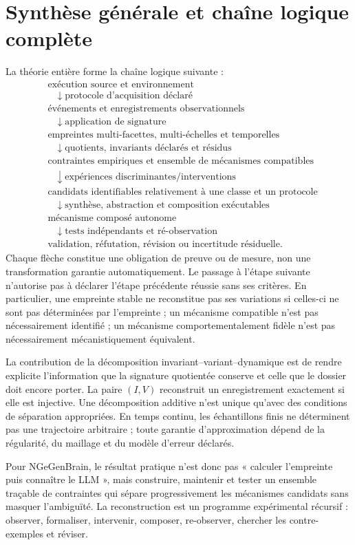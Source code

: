 \documentclass[11pt,oneside]{book}
\theoremstyle{definition}
\theoremstyle{remark}
\newcommand{\1}{\mathbf 1}
\begin{document}
\chapter{Synthèse générale et chaîne logique complète}
La théorie entière forme la chaîne logique suivante :
\[
\begin{aligned}
&\text{exécution source et environnement}\\
&\quad\downarrow\;\text{protocole d'acquisition déclaré}\\
&\text{événements et enregistrements observationnels}\\
&\quad\downarrow\;\text{application de signature}\\
&\text{empreintes multi-facettes, multi-échelles et temporelles}\\
&\quad\downarrow\;\text{quotients, invariants déclarés et résidus}\\
&\text{contraintes empiriques et ensemble de mécanismes compatibles}\\
&\quad\downarrow\;\text{expériences discriminantes/interventions}\\
&\text{candidats identifiables relativement à une classe et un protocole}\\
&\quad\downarrow\;\text{synthèse, abstraction et composition exécutables}\\
&\text{mécanisme composé autonome}\\
&\quad\downarrow\;\text{tests indépendants et ré-observation}\\
&\text{validation, réfutation, révision ou incertitude résiduelle}.
\end{aligned}
\]
Chaque flèche constitue une obligation de preuve ou de mesure, non une transformation garantie automatiquement. Le passage à l'étape suivante n'autorise pas à déclarer l'étape précédente réussie sans ses critères. En particulier, une empreinte stable ne reconstitue pas ses variations si celles-ci ne sont pas déterminées par l'empreinte ; un mécanisme compatible n'est pas nécessairement identifié ; un mécanisme comportementalement fidèle n'est pas nécessairement mécanistiquement équivalent.

La contribution de la décomposition invariant--variant--dynamique est de rendre explicite l'information que la signature quotientée conserve et celle que le dossier doit encore porter. La paire $(I,V)$ reconstruit un enregistrement exactement si elle est injective. Une décomposition additive n'est unique qu'avec des conditions de séparation appropriées. En temps continu, les échantillons finis ne déterminent pas une trajectoire arbitraire ; toute garantie d'approximation dépend de la régularité, du maillage et du modèle d'erreur déclarés.

Pour NGeGenBrain, le résultat pratique n'est donc pas « calculer l'empreinte puis connaître le LLM », mais construire, maintenir et tester un ensemble traçable de contraintes qui sépare progressivement les mécanismes candidats sans masquer l'ambiguïté. La reconstruction est un programme expérimental récursif : observer, formaliser, intervenir, composer, re-observer, chercher les contre-exemples et réviser.

\backmatter
\end{document}
